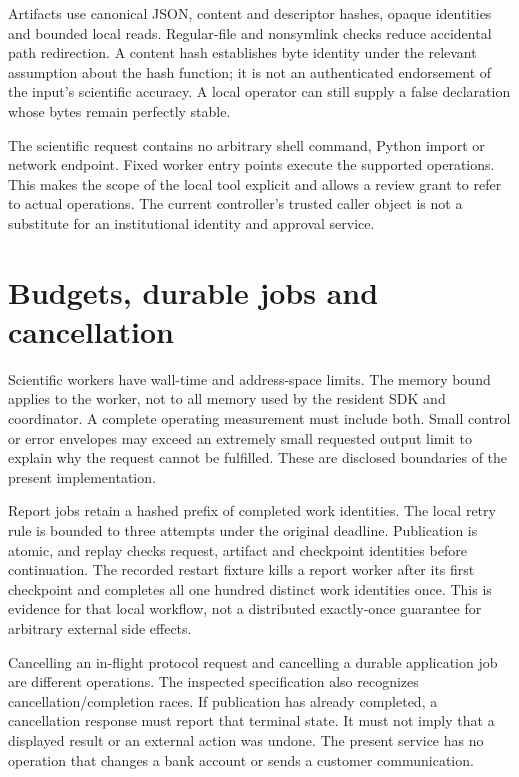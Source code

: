 Artifacts use canonical JSON, content and descriptor hashes, opaque identities
and bounded local reads. Regular-file and nonsymlink checks reduce accidental
path redirection. A content hash establishes byte identity under the relevant
assumption about the hash function; it is not an authenticated endorsement of
the input's scientific accuracy. A local operator can still supply a false
declaration whose bytes remain perfectly stable.

The scientific request contains no arbitrary shell command, Python import or
network endpoint. Fixed worker entry points execute the supported operations.
This makes the scope of the local tool explicit and allows a review grant to
refer to actual operations. The current controller's trusted caller object is
not a substitute for an institutional identity and approval service.

\section{Budgets, durable jobs and cancellation}

Scientific workers have wall-time and address-space limits. The memory bound
applies to the worker, not to all memory used by the resident SDK and
coordinator. A complete operating measurement must include both. Small control
or error envelopes may exceed an extremely small requested output limit to
explain why the request cannot be fulfilled. These are disclosed boundaries of
the present implementation.\cite{v12_in_runtime}

Report jobs retain a hashed prefix of completed work identities. The local
retry rule is bounded to three attempts under the original deadline. Publication
is atomic, and replay checks request, artifact and checkpoint identities before
continuation. The recorded restart fixture kills a report worker after its
first checkpoint and completes all one hundred distinct work identities once.
This is evidence for that local workflow, not a distributed exactly-once
guarantee for arbitrary external side effects.

Cancelling an in-flight protocol request and cancelling a durable application
job are different operations. The inspected specification also recognizes
cancellation/completion races.\cite{v12_mcp_legacy_cancellation} If publication
has already completed, a cancellation response must report that terminal state.
It must not imply that a displayed result or an external action was undone.
The present service has no operation that changes a bank account or sends a
customer communication.

